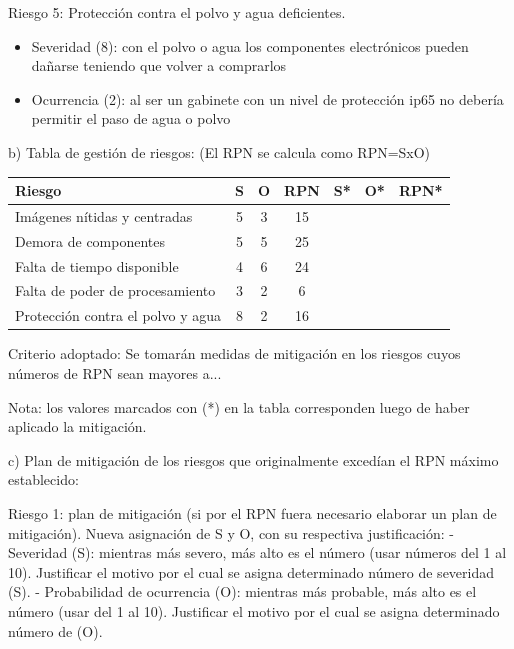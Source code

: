 \documentclass[11pt]{charter}
\begin{document}
Riesgo 5: Protección contra el polvo y agua deficientes.

\begin{itemize}
\item Severidad (8): con el polvo o agua los componentes electrónicos pueden dañarse teniendo que volver a comprarlos 
\item Ocurrencia (2): al ser un gabinete con un nivel de protección ip65 no debería permitir el paso de agua o polvo  
\end{itemize}


b) Tabla de gestión de riesgos:      (El RPN se calcula como RPN=SxO)

\begin{table}[htpb]
\centering
\begin{tabularx}{\linewidth}{@{}|X|c|c|c|c|c|c|@{}}
\hline
\rowcolor[HTML]{C0C0C0} 
Riesgo 								& S	& O	& RPN & S* & O* & RPN* \\ \hline
Imágenes nítidas y centradas		& 5 & 3 & 15  &    &    &      \\ \hline
Demora de componentes     			& 5 & 5 & 25  &    &    &      \\ \hline
Falta de tiempo disponible    		& 4 & 6 & 24  &    &    &      \\ \hline
Falta de poder de procesamiento		& 3 & 2 & 6   &    &    &      \\ \hline
Protección contra el polvo y agua	& 8 & 2 & 16  &    &    &      \\ \hline
\end{tabularx}%
\end{table}

Criterio adoptado: 
Se tomarán medidas de mitigación en los riesgos cuyos números de RPN sean mayores a...

Nota: los valores marcados con (*) en la tabla corresponden luego de haber aplicado la mitigación.

c) Plan de mitigación de los riesgos que originalmente excedían el RPN máximo establecido:
 
Riesgo 1: plan de mitigación (si por el RPN fuera necesario elaborar un plan de mitigación).
  Nueva asignación de S y O, con su respectiva justificación:
  - Severidad (S): mientras más severo, más alto es el número (usar números del 1 al 10).
          Justificar el motivo por el cual se asigna determinado número de severidad (S).
  - Probabilidad de ocurrencia (O): mientras más probable, más alto es el número (usar del 1 al 10).
          Justificar el motivo por el cual se asigna determinado número de (O).
\end{document}
